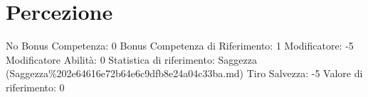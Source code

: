 \section{Percezione}\label{percezione}

\begin{description}
\tightlist
\item[Tags: ABI]
No Bonus Competenza: 0 Bonus Competenza di Riferimento: 1 Modificatore:
-5 Modificatore Abilità: 0 Statistica di riferimento: Saggezza
(Saggezza\%202e64616e72b64e6c9dfb8e24a04c33ba.md) Tiro Salvezza: -5
Valore di riferimento: 0
\end{description}
